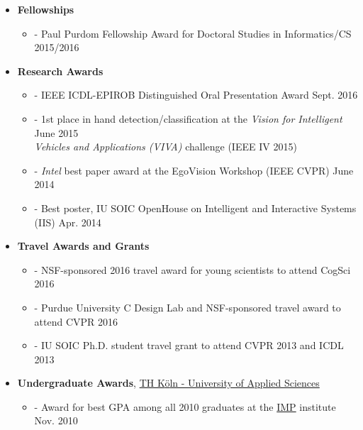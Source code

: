 \documentclass[10pt]{article}
\newenvironment{outerlist}[1][\enskip\textbullet]%
        {\begin{itemize}[#1,leftmargin=*,parsep=5pt,itemsep=0pt,topsep=0pt,partopsep=0pt]}{\end{itemize}%
         \vspace{-.6\baselineskip}}
\newenvironment{innerlist}[1][\enskip\textbullet]%
        {\begin{itemize}[#1,leftmargin=*,parsep=0pt,itemsep=3pt,topsep=-2pt,partopsep=0pt]}
        {\end{itemize}}
\begin{document}
\begin{outerlist}

    \item \textbf{Fellowships}

    \begin{innerlist}
        \item[-] Paul Purdom Fellowship Award for Doctoral Studies in Informatics/CS \hfill 2015/2016
    \end{innerlist}

    \item \textbf{Research Awards}

    \begin{innerlist}
        \item[-] IEEE ICDL-EPIROB Distinguished Oral Presentation Award \hfill{Sept. 2016}
        \item[-] 1st place in hand detection/classification at the \emph{Vision for Intelligent} \hfill{June 2015}\\ \emph{Vehicles and Applications (VIVA)} challenge (IEEE IV 2015)
        \item[-] \emph{Intel} best paper award at the EgoVision Workshop (IEEE CVPR)  \hfill June 2014
        \item[-] Best poster, IU SOIC OpenHouse on Intelligent and Interactive Systems (IIS) \hfill Apr. 2014
    \end{innerlist}

    \item \textbf{Travel Awards and Grants}

    \begin{innerlist}
        \item[-] NSF-sponsored 2016 travel award for young scientists to attend CogSci 2016
        \item[-] Purdue University C Design Lab and NSF-sponsored travel award to attend CVPR 2016
        \item[-] IU SOIC Ph.D. student travel grant to attend CVPR 2013 and ICDL 2013
    \end{innerlist}

    \item \textbf{Undergraduate Awards}, \href{https://www.th-koeln.de/en/homepage_26.php}{TH K{\"o}ln - University of Applied Sciences}

    \begin{innerlist}
        \item[-] Award for best GPA among all 2010 graduates at the \href{https://www.th-koeln.de/en/information-media-and-electrical-engineering/faculty-of-information-media-and-electrical-engineering_6817.php}{IMP} institute \hfill Nov. 2010
    \end{innerlist}

\end{outerlist}
\end{document}
